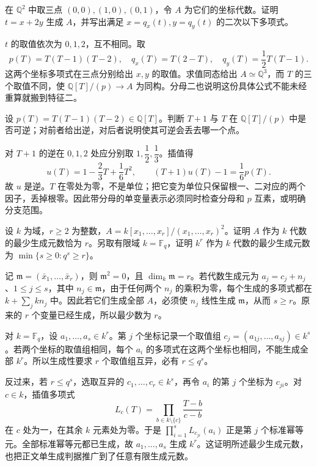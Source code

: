\begin{exercise}\label{b3:ex:08-separating-coordinate}
	在 \(\mathbb Q^2\) 中取三点 \((0,0),(1,0),(0,1)\)，令 \(A\) 为它们的坐标代数。证明 \(t=x+2y\) 生成 \(A\)，并写出满足 \(x=q_x(t),y=q_y(t)\) 的二次以下多项式。
\end{exercise}
\begin{solution}
	\(t\) 的取值依次为 \(0,1,2\)，互不相同。取
	\[
		p(T)=T(T-1)(T-2),\quad q_x(T)=T(2-T),\quad q_y(T)=\dfrac{1}{2}T(T-1).
	\]
	这两个坐标多项式在三点分别给出 \(x,y\) 的取值。求值同态给出 \(A\simeq\mathbb Q^3\)，而 \(T\) 的三个取值不同，使 \(\mathbb Q[T]/(p)\to A\) 为同构。分母二也说明这份具体公式不能未经重算就搬到特征二。
\end{solution}

\begin{exercise}\label{b3:ex:08-rur-denominator}
	设 \(p(T)=T(T-1)(T-2)\in\mathbb Q[T]\)。判断 \(T+1\) 与 \(T\) 在 \(\mathbb Q[T]/(p)\) 中是否可逆；对前者给出逆，对后者说明使其可逆会丢去哪一个点。
\end{exercise}
\begin{solution}
	对 \(T+1\) 的逆在 \(0,1,2\) 处应分别取 \(1,\dfrac12,\dfrac13\)。插值得
	\[
		u(T)=1-\dfrac{2}{3}T+\dfrac{1}{6}T^2,\qquad (T+1)u(T)-1=\dfrac{1}{6}p(T).
	\]
	故 \(u\) 是逆。\(T\) 在零处为零，不是单位；把它变为单位只保留根一、二对应的两个因子，丢掉根零。因此带分母的单变量表示必须同时检查分母和 \(p\) 互素，或明确分支范围。
\end{solution}

\begin{exercise}\label{b3:ex:08-nonmonogenic}
	设 \(k\) 为域，\(r\ge2\) 为整数，\(A=k[x_1,\ldots,x_r]/(x_1,\ldots,x_r)^2\)。证明 \(A\) 作为 \(k\) 代数的最少生成元数恰为 \(r\)。另取有限域 \(k=\mathbb F_q\)，证明 \(k^r\) 作为 \(k\) 代数的最少生成元数为 \(\min\{s\ge0:q^s\ge r\}\)。
\end{exercise}
\begin{solution}
	记 \(\mathfrak m=(\bar x_1,\ldots,\bar x_r)\)，则 \(\mathfrak m^2=0\)，且 \(\dim_k\mathfrak m=r\)。若代数生成元为 \(a_j=c_j+n_j\)、\(1\le j\le s\)，其中 \(n_j\in\mathfrak m\)，由于任何两个 \(n_j\) 的乘积为零，每个生成的多项式都在 \(k+\sum_jkn_j\) 中。因此若它们生成全部 \(A\)，必须使 \(n_j\) 线性生成 \(\mathfrak m\)，从而 \(s\ge r\)。原来的 \(r\) 个变量已经生成，所以最少数为 \(r\)。

	对 \(k=\mathbb F_q\)，设 \(a_1,\ldots,a_s\in k^r\)。第 \(j\) 个坐标记录一个取值组 \(c_j=(a_{1j},\ldots,a_{sj})\in k^s\)。若两个坐标的取值组相同，每个 \(a_i\) 的多项式在这两个坐标也相同，不能生成全部 \(k^r\)。所以生成性要求 \(r\) 个取值组互异，必有 \(r\le q^s\)。

	反过来，若 \(r\le q^s\)，选取互异的 \(c_1,\ldots,c_r\in k^s\)，再令 \(a_i\) 的第 \(j\) 个坐标为 \(c_{ji}\)。对 \(c\in k\)，插值多项式
	\[
		L_c(T)=\prod_{b\in k\setminus\{c\}}\frac{T-b}{c-b}
	\]
	在 \(c\) 处为一，在其余 \(k\) 元素处为零。于是 \(\prod_{i=1}^s L_{c_{ji}}(a_i)\) 正是第 \(j\) 个标准幂等元。全部标准幂等元都已生成，故 \(a_1,\ldots,a_s\) 生成 \(k^r\)。这证明所述最少生成元数，也把正文单生成判据推广到了任意有限生成元数。
\end{solution}


